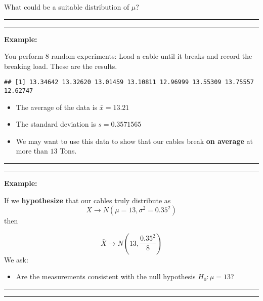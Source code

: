 \documentclass[
]{book}
\providecommand{\tightlist}{%
  \setlength{\itemsep}{0pt}\setlength{\parskip}{0pt}}
\begin{document}
What could be a suitable distribution of \(\mu\)?

\begin{center}\rule{0.5\linewidth}{0.5pt}\end{center}

\begin{center}\rule{0.5\linewidth}{0.5pt}\end{center}

\textbf{Example:}

You perform \(8\) random experiments: Load a cable until it breaks and record the breaking load. These are the results.

\begin{verbatim}
## [1] 13.34642 13.32620 13.01459 13.10811 12.96999 13.55309 13.75557 12.62747
\end{verbatim}

\begin{itemize}
\tightlist
\item
  The average of the data is \(\bar{x}=13.21\)
\item
  The standard deviation is \(s=0.3571565\)
\item
  We may want to use this data to show that our cables break \textbf{on average} at more than \(13\) Tons.
\end{itemize}

\begin{center}\rule{0.5\linewidth}{0.5pt}\end{center}

\begin{center}\rule{0.5\linewidth}{0.5pt}\end{center}

\textbf{Example:}

If we \textbf{hypothesize} that our cables truly distribute as \[X \rightarrow N(\mu=13, \sigma^2=0.35^2)\] then

\[\bar{X} \rightarrow N(13, \frac{0.35^2}{8})\]
We ask:

\begin{itemize}
\tightlist
\item
  Are the measurements consistent with the null hypothesis \(H_0: \mu=13\)?
\end{itemize}

\begin{center}\rule{0.5\linewidth}{0.5pt}\end{center}

\begin{center}\rule{0.5\linewidth}{0.5pt}\end{center}
\end{document}
